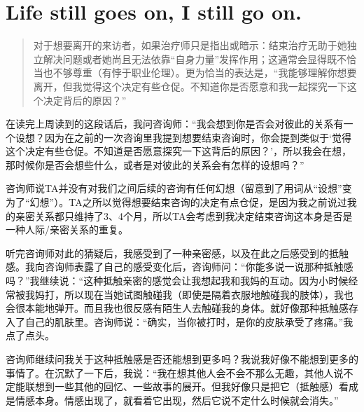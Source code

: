 \chapter{Life still goes on, I still go on.}



\blockquote{
    对于想要离开的来访者，如果治疗师只是指出或暗示：结束治疗无助于她独立解决问题或者她尚且无法依靠“自身力量”发挥作用；这通常会显得既不恰当也不够尊重（有悖于职业伦理）。更为恰当的表达是，“我能够理解你想要离开，但我觉得这个决定有些仓促。不知道你是否愿意和我一起探究一下这个决定背后的原因？”
}

在读完上周读到的这段话后，我问咨询师：“我会想到你是否会对彼此的关系有一个设想？因为在之前的一次咨询里我提到想要结束咨询时，你会提到类似于‘觉得这个决定有些仓促。不知道是否愿意探究一下这背后的原因？’，所以我会在想，那时候你是否会想些什么，或者是对彼此的关系会有怎样的设想吗？”

咨询师说TA并没有对我们之间后续的咨询有任何幻想（留意到了用词从“设想”变为了“幻想”）。TA之所以觉得想要结束咨询的决定有点仓促，是因为我之前说过我的亲密关系都只维持了3、4个月，所以TA会考虑到我决定结束咨询这本身是否是一种人际/亲密关系的重复。

听完咨询师对此的猜疑后，我感受到了一种亲密感，以及在此之后感受到的抵触感。我向咨询师表露了自己的感受变化后，咨询师问：“你能多说一说那种抵触感吗？”我继续说：“这种抵触亲密的感觉会让我想起我和我妈的互动。因为小时候经常被我妈打，所以现在当她试图触碰我（即使是隔着衣服地触碰我的肢体），我也会很本能地弹开。而且我也很反感有陌生人去触碰我的身体。就好像那种抵触感存入了自己的肌肤里。咨询师说：“确实，当你被打时，是你的皮肤承受了疼痛。”我点了点头。

咨询师继续问我关于这种抵触感是否还能想到更多吗？我说我好像不能想到更多的事情了。在沉默了一下后，我说：“我在想其他人会不会不那么无趣，其他人说不定能联想到一些其他的回忆、一些故事的展开。但我好像只是把它（抵触感）看成是情感本身。情感出现了，就看着它出现，然后它说不定什么时候就会消失。”

